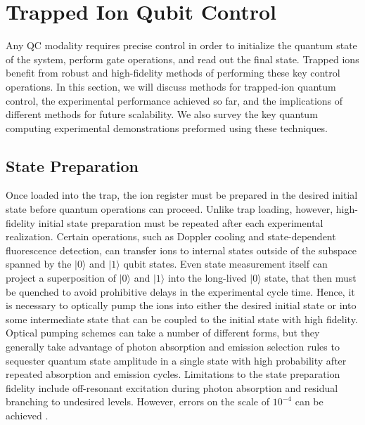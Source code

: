 \documentclass[%
12pt,
 amsmath,amssymb,
]{revtex4-2}
\newcommand{\zero}{|0 \rangle}
\newcommand{\one}{|1 \rangle}
\begin{document}
\section{Trapped Ion Qubit Control}
\label{sec_ion_control}

Any QC modality requires precise control in order to initialize the quantum state of the system, perform gate operations, and read out the final state. Trapped ions benefit from robust and high-fidelity methods of performing these key control operations. In this section, we will discuss methods for trapped-ion quantum control, the experimental performance achieved so far, and the implications of different methods for future scalability.  We also survey the key quantum computing experimental demonstrations preformed using these techniques.




\subsection{State Preparation}
Once loaded into the trap, the ion register must be prepared in the desired initial state before quantum operations can proceed. Unlike trap loading, however, high-fidelity initial state preparation must be repeated after each experimental realization. Certain operations, such as Doppler cooling and state-dependent fluorescence detection, can transfer ions to internal states outside of the subspace spanned by the $|0\rangle$ and  $|1\rangle$ qubit states. Even state measurement itself can project a superposition of $\zero$ and $\one$ into the long-lived $\zero$ state, that then must be quenched to avoid prohibitive delays in the experimental cycle time. Hence, it is necessary to optically pump the ions into either the desired initial state or into some intermediate state that can be coupled to the initial state with high fidelity. Optical pumping schemes can take a number of different forms, but they generally take advantage of photon absorption and emission selection rules to sequester quantum state amplitude in a single state with high probability after repeated absorption and emission cycles. Limitations to the state preparation fidelity include off-resonant excitation during photon absorption and residual branching to undesired levels. However, errors on the scale of $10^{-4}$ can be achieved \cite{HartyHighFidelityIons2014}.
\end{document}
